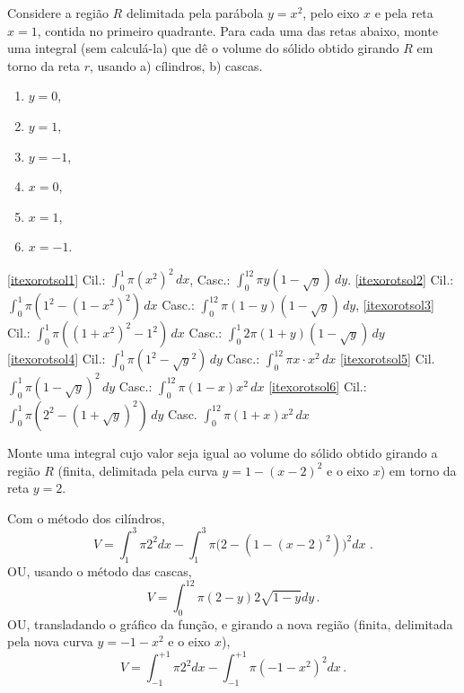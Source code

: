 \begin{exo}
Considere a região $R$ delimitada pela parábola $y=x^2$, 
pelo eixo $x$ e pela reta $x=1$,
contida no primeiro quadrante.
Para cada uma das retas abaixo, monte uma integral (sem calculá-la) que dê o volume do
sólido obtido girando $R$ em torno da reta $r$, usando a) cílindros, b) cascas.
\begin{multicols}{3}
\begin{enumerate}
\item\label{itexorotsol1}  $y=0$,
\item\label{itexorotsol2} $y=1$,
\item\label{itexorotsol3}   $y=-1$,
\item\label{itexorotsol4} $x=0$,
\item\label{itexorotsol5} $x=1$,
\item\label{itexorotsol6} $x=-1$.
\end{enumerate}
\end{multicols}
\vspace{0.01cm}
\begin{sol}
\eqref{itexorotsol1}
Cil.: $\int_0^1\pi (x^2)^2\,dx$, 
Casc.:
$\int_0^12\pi y(1-\sqrt{y})\,dy$.
\eqref{itexorotsol2}
Cil.: $\int_0^1\pi(1^2-(1-x^2)^2)\,dx$
Casc.: $\int_0^12\pi(1-y)(1-\sqrt{y})\,dy$,
\eqref{itexorotsol3}
Cil.: $\int_0^1\pi((1+x^2)^2-1^2)\,dx$
Casc.: $\int_0^1 2\pi(1+y)(1-\sqrt{y})\,dy$
\eqref{itexorotsol4}
Cil.: $\int_0^1\pi(1^2-\sqrt{y}^2)\,dy$
Casc.: $\int_0^12\pi x\cdot x^2\,dx$
\eqref{itexorotsol5}
Cil. $\int_0^1\pi(1-\sqrt{y})^2\,dy$
Casc.: $\int_0^12\pi(1-x)x^2\,dx$
\eqref{itexorotsol6}
Cil.: $\int_0^1\pi(2^2-(1+\sqrt{y})^2)\,dy$
Casc. $\int_0^12\pi(1+x)x^2\,dx$
\end{sol}
\end{exo}


\begin{exo}
Monte uma integral cujo valor seja igual ao volume do
sólido obtido girando a região $R$ (finita, delimitada pela curva $y=1-(x-2)^2$
e o eixo $x$) em torno da reta $y=2$.
\begin{sol}
Com o método dos cilíndros,
$$V=\int_1^3\pi 2^2dx-\int_1^3\pi\big(2-(1-(x-2)^2)\big)^2dx\,\,.$$
OU, usando o método das cascas, 
$$
V=\int_0^12\pi(2-y)2\sqrt{1-y}dy\,.
$$
OU, transladando o gráfico da função, e girando a nova região (finita,
delimitada pela nova curva $y=-1-x^2$ e o eixo $x$),
$$V=\int_{-1}^{+1}\pi 2^2dx-\int_{-1}^{+1}\pi(-1-x^2)^2dx\,.$$
\end{sol}
\end{exo}


